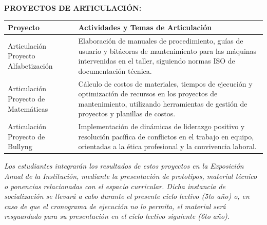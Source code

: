 \documentclass[11pt, a4paper]{article}
\begin{document}
\vspace{1em}
\noindent \textbf{PROYECTOS DE ARTICULACIÓN:}

\begin{tabular}{|p{5cm}|p{12cm}|}
\hline
\rowcolor{gray!20} \textbf{Proyecto} & \textbf{Actividades y Temas de Articulación} \\
\hline
Articulación Proyecto Alfabetización & Elaboración de manuales de procedimiento, guías de usuario y bitácoras de mantenimiento para las máquinas intervenidas en el taller, siguiendo normas ISO de documentación técnica. \\
\hline
Articulación Proyecto de Matemáticas & Cálculo de costos de materiales, tiempos de ejecución y optimización de recursos en los proyectos de mantenimiento, utilizando herramientas de gestión de proyectos y planillas de costos. \\
\hline
Articulación Proyecto de Bullyng & Implementación de dinámicas de liderazgo positivo y resolución pacífica de conflictos en el trabajo en equipo, orientadas a la ética profesional y la convivencia laboral. \\
\hline
\end{tabular}

\vspace{1em}

\noindent \textit{Los estudiantes integrarán los resultados de estos proyectos en la Exposición Anual de la Institución, mediante la presentación de prototipos, material técnico o ponencias relacionadas con el espacio curricular. Dicha instancia de socialización se llevará a cabo durante el presente ciclo lectivo (5to año) o, en caso de que el cronograma de ejecución no lo permita, el material será resguardado para su presentación en el ciclo lectivo siguiente (6to año).}
\end{document}
